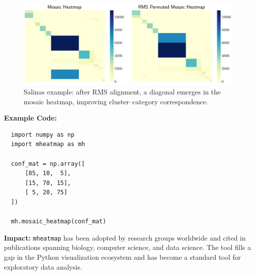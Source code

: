\begin{figure}
  \centering
  \includegraphics[width=\linewidth]{assets/2002_mheatmap/03b_salinas_rms.png}
  \caption{Salinas example: after RMS alignment, a diagonal emerges in the mosaic heatmap, improving cluster–category correspondence.}
  \label{fig:03_salinas_rms}
  \vspace{-15em}
\end{figure}

\textbf{Example Code:}
\begin{verbatim}
  import numpy as np
  import mheatmap as mh
  
  conf_mat = np.array([
      [85, 10,  5],
      [15, 70, 15],
      [ 5, 20, 75]
  ])
  
  mh.mosaic_heatmap(conf_mat)
\end{verbatim}

\textbf{Impact:}
\texttt{mheatmap} has been adopted by research groups worldwide and cited in publications spanning biology, computer science, and data science. The tool fills a gap in the Python visualization ecosystem and has become a standard tool for exploratory data analysis.
